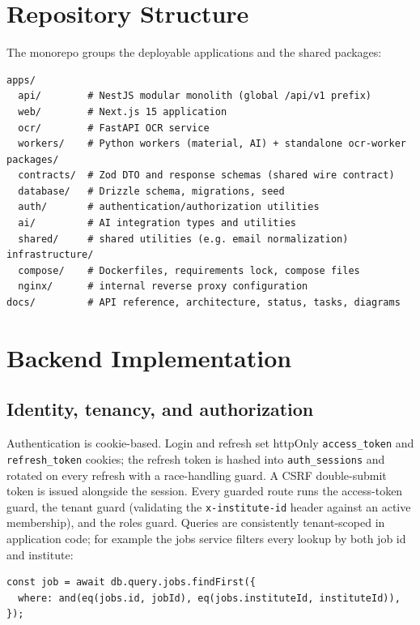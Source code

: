 \section{Repository Structure}

The monorepo groups the deployable applications and the shared packages:

\begin{lstlisting}[basicstyle=\ttfamily\footnotesize]
apps/
  api/        # NestJS modular monolith (global /api/v1 prefix)
  web/        # Next.js 15 application
  ocr/        # FastAPI OCR service
  workers/    # Python workers (material, AI) + standalone ocr-worker
packages/
  contracts/  # Zod DTO and response schemas (shared wire contract)
  database/   # Drizzle schema, migrations, seed
  auth/       # authentication/authorization utilities
  ai/         # AI integration types and utilities
  shared/     # shared utilities (e.g. email normalization)
infrastructure/
  compose/    # Dockerfiles, requirements lock, compose files
  nginx/      # internal reverse proxy configuration
docs/         # API reference, architecture, status, tasks, diagrams
\end{lstlisting}

\section{Backend Implementation}

\subsection{Identity, tenancy, and authorization}

Authentication is cookie-based. Login and refresh set httpOnly
\texttt{access\_\hspace{0pt}token} and \texttt{refresh\_\hspace{0pt}token}
cookies; the refresh token
is hashed into \texttt{auth\_\hspace{0pt}sessions} and rotated on every
refresh with a
race-handling guard. A CSRF double-submit token is issued alongside the
session. Every guarded route runs the access-token guard, the tenant guard
(validating the \texttt{x-institute-id} header against an active membership),
and the roles guard. Queries are consistently tenant-scoped in application
code; for example the jobs service filters every lookup by both job id and
institute:

\begin{lstlisting}[basicstyle=\ttfamily\footnotesize]
const job = await db.query.jobs.findFirst({
  where: and(eq(jobs.id, jobId), eq(jobs.instituteId, instituteId)),
});
\end{lstlisting}

